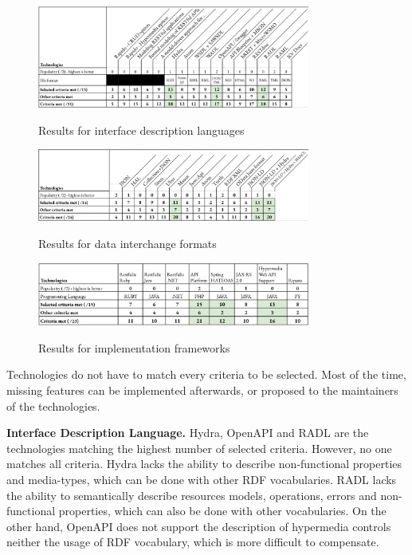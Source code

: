 \begin{figure}[ht]
\caption{Results for interface description languages}
\centering
\includegraphics[width=0.8\textwidth]{figures/example-idl-results.png}
\label{example-idl-results}
\end{figure}

\begin{figure}[ht]
\caption{Results for data interchange formats}
\centering
\includegraphics[width=0.8\textwidth]{figures/example-dif-results.png}
\label{example-dif-results}
\end{figure}

\begin{figure}[ht]
\caption{Results for implementation frameworks}
\centering
\includegraphics[width=0.8\textwidth]{figures/example-frameworks-results.png}
\label{example-frameworks-results}
\end{figure}

Technologies do not have to match every criteria to be selected. Most of the time, missing features can be implemented afterwards, or proposed to the maintainers of the technologies.

\textbf{Interface Description Language.} Hydra, OpenAPI and RADL are the technologies matching the highest number of selected criteria. However, no one matches all criteria. Hydra lacks the ability to describe non-functional properties and media-types, which can be done with other RDF vocabularies. RADL lacks the ability to semantically describe resources models, operations, errors and non-functional properties, which can also be done with other vocabularies. On the other hand, OpenAPI does not support the description of hypermedia controls neither the usage of RDF vocabulary, which is more difficult to compensate. 

